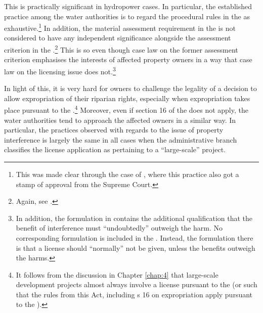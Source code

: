 This is practically significant in hydropower cases. In particular, the established practice among the water authorities is to regard the procedural rules in the \cite{wra17} as exhaustive.\footnote{This was made clear through the case of \cite{jorpeland11}, where this practice also got a stamp of approval from the Supreme Court.} In addition, the material assessment requirement in the \cite{ea59} is not considered to have any independent significance alongside the assessment criterion in the \cite{wra17}.\footnote{Again, see \cite{jorpeland11}.} This is so even though case law on the former assessment criterion emphasises the interests of affected property owners in a way that case law on the licensing issue does not.\footnote{In addition, the formulation in \cite[2]{ea59} contains the additional qualification that the benefit of interference must ``undoubtedly'' outweigh the harm. No corresponding formulation is included in the \cite[8]{wra17}. Instead, the formulation there is that a license should ``normally'' not be given, unless the benefits outweigh the harms.}


In light of this, it is very hard for owners to challenge the legality of a decision to allow expropriation of their riparian rights, especially when expropriation takes place pursuant to the \cite{wra17}.\footnote{It follows from the discussion in Chapter \ref{chap:4} that large-scale development projects almost always involve a license pursuant to the \cite{wra17} (or such that the rules from this Act, including s 16 on expropriation apply pursuant to the \cite{wra00}).} Moreover, even if section 16 of the \cite{wra17} does not apply, the water authorities tend to approach the affected owners in a similar way. In particular, the practices observed with regards to the issue of property interference is largely the same in all cases when the administrative branch classifies the license application as pertaining to a ``large-scale'' project. 

